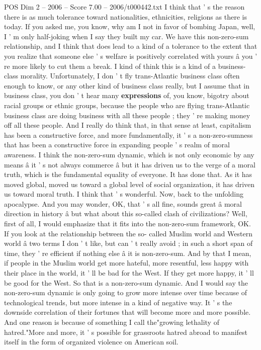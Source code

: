 \begin{textsample}{POS Dim 2 – 2006 – Score 7.00 – 2006/t000442.txt}
I think that ' s the reason there is as much tolerance toward nationalities, ethnicities, religions as there is today.
If you asked me, you know, why am I not in favor of bombing Japan, well, I ' m only half-joking when I say they built my car.
We have this non-zero-sum relationship, and I think that does lead to a kind of a tolerance to the extent that you realize that someone else ' s welfare is positively correlated with yours â you ' re more likely to cut them a break.
I kind of think this is a kind of a business-class morality.
Unfortunately, I don ' t fly trans-Atlantic business class often enough to know, or any other kind of business class really, but I assume that in business class, you don ' t hear many \textbf{expressions} of, you know, bigotry about racial groups or ethnic groups, because the people who are flying trans-Atlantic business class are doing business with all these people ; they ' re making money off all these people.
And I really do think that, in that sense at least, capitalism has been a constructive force, and more fundamentally, it ' s a non-zero-sumness that has been a constructive force in expanding people ' s realm of moral awareness.
I think the non-zero-sum dynamic, which is not only economic by any means â it ' s not always commerce â but it has driven us to the verge of a moral truth, which is the fundamental equality of everyone.
It has done that.
As it has moved global, moved us toward a global level of social organization, it has driven us toward moral truth.
I think that ' s wonderful.
Now, back to the unfolding apocalypse.
And you may wonder, OK, that ' s all fine, sounds great â moral direction in history â but what about this so-called clash of civilizations?
Well, first of all, I would emphasize that it fits into the non-zero-sum framework, OK.
If you look at the relationship between the so- called Muslim world and Western world â two terms I don ' t like, but can ' t really avoid ; in such a short span of time, they ' re efficient if nothing else â it is non-zero-sum.
And by that I mean, if people in the Muslim world get more hateful, more resentful, less happy with their place in the world, it ' ll be bad for the West.
If they get more happy, it ' ll be good for the West.
So that is a non-zero-sum dynamic.
And I would say the non-zero-sum dynamic is only going to grow more intense over time because of technological trends, but more intense in a kind of negative way.
It ' s the downside correlation of their fortunes that will become more and more possible.
And one reason is because of something I call the"growing lethality of hatred."More and more, it ' s possible for grassroots hatred abroad to manifest itself in the form of organized violence on American soil.

\end{textsample}
